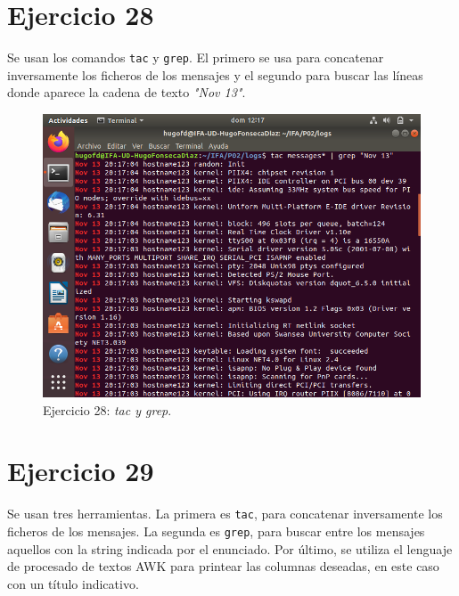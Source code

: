 \documentclass[11pt]{article}
\begin{document}
\section{Ejercicio 28}
Se usan los comandos \verb|tac| y \verb|grep|. El primero se usa para concatenar inversamente los ficheros de los mensajes y el segundo para buscar las líneas donde aparece la cadena de texto \textit{"Nov 13"}.

\begin{figure}[H]
    \caption{Ejercicio 28: \textit{tac y grep}.}
  \centering
  \includegraphics[scale=0.7]{e28.png}
\end{figure}

\section{Ejercicio 29}
Se usan tres herramientas. La primera es \verb|tac|, para concatenar inversamente los ficheros de los mensajes. La segunda es \verb|grep|, para buscar entre los mensajes aquellos con la string indicada por el enunciado. Por último, se utiliza el lenguaje de procesado de textos AWK para printear las columnas deseadas, en este caso con un título indicativo.
\end{document}
